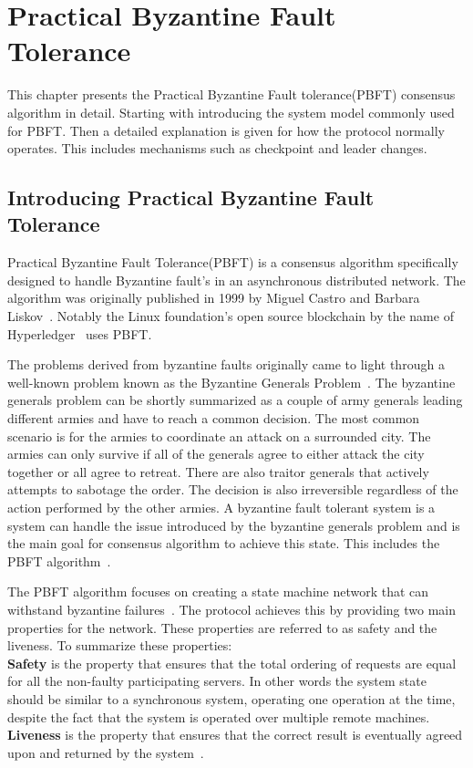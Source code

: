 \chapter{Practical Byzantine Fault Tolerance}
\label{chapter:PBFT}
This chapter presents the Practical Byzantine Fault tolerance(PBFT) consensus algorithm in detail. 
Starting with introducing the system model commonly used for PBFT. Then a detailed explanation is given for how the protocol normally operates. This includes mechanisms such as checkpoint and leader changes.
\section{Introducing Practical Byzantine Fault Tolerance}
Practical Byzantine Fault Tolerance(PBFT) is a consensus algorithm specifically designed to handle Byzantine fault's in an asynchronous distributed network. The algorithm was originally published in 1999 by Miguel Castro and Barbara Liskov~\cite{PAPER:OGPBFT}.
Notably the Linux foundation's open source blockchain by the name of Hyperledger~\cite{WEB:PBFTGeeks, SLIDES:PBFT} uses PBFT.

The problems derived from byzantine faults originally came to light through a well-known problem known as the Byzantine Generals Problem~\cites{WEB:BFTInfo}{ART:lamportByzGenProb}[p.~240-253]{BOOK:BuildDepDistSyst}.
The byzantine generals problem can be shortly summarized as a couple of army generals leading different armies and have to reach a common decision. The most common scenario is for the armies to coordinate an attack on a surrounded city. The armies can only survive if all of the generals agree to either attack the city together or all agree to retreat. There are also traitor generals that actively attempts to sabotage the order. The decision is also irreversible regardless of the action performed by the other armies. A byzantine fault tolerant system is a system can handle the issue introduced by the byzantine generals problem and is the main goal for consensus algorithm to achieve this state. This includes the PBFT algorithm~\cite{WEB:BFTInfo, ART:lamportByzGenProb}.

The PBFT algorithm focuses on creating a state machine network that can withstand byzantine failures~\cite[p.~456]{BOOK:MVstandver3}. The protocol achieves this by providing two main properties for the network. These properties are referred to as safety and the liveness.
To summarize these properties:\\
\textbf{Safety} is the property that ensures that the total ordering of requests are equal for all the non-faulty participating servers. In other words the system state should be similar to a synchronous system, operating one operation at the time, despite the fact that the system is operated over multiple remote machines.\\ 
\textbf{Liveness} is the property that ensures that the correct result is eventually agreed upon and returned by the system~\cites[p.~456]{BOOK:MVstandver3}{WEB:ConsesAlgo}[p.~2]{PAPER:OGPBFT}{SLIDES:PBFT}[p.~403]{PAPER:PBFTRecovery}[p.~257]{BOOK:BuildDepDistSyst}.

